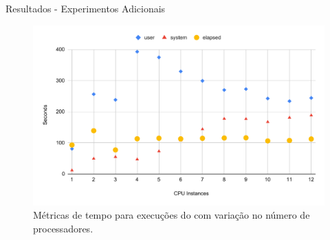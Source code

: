 \documentclass[aspectratio=1610,10pt]{beamer}
\begin{document}
\begin{frame}[fragile]{Resultados - Experimentos Adicionais}
  \begin{figure}
    \centering
    \includegraphics[width=0.7\linewidth,page=1]{experiments/speedup-clean.pdf}
    \caption{Métricas de tempo para execuções do \mfog com variação no número de processadores.}
    \label{fig:speedup}
  \end{figure}
\end{frame}
\end{document}
